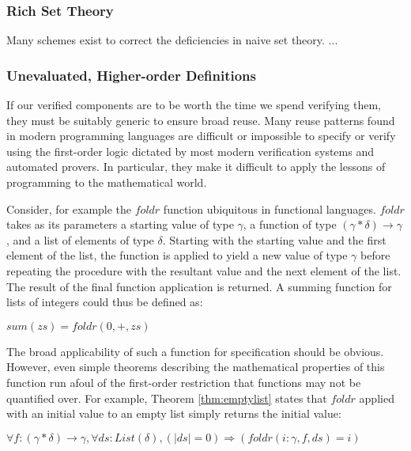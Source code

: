 \subsubsection{Rich Set Theory}\label{subsubsect:richSetTheory}
Many schemes exist to correct the deficiencies in naive set theory.  ...

\subsubsection{Unevaluated, Higher-order Definitions}\label{subsubsect:higherOrderDefinitions}
If our verified components are to be worth the time we spend verifying them, they must be suitably generic to ensure broad reuse.  Many reuse patterns found in modern programming languages are difficult or impossible to specify or verify using the first-order logic dictated by most modern verification systems and automated provers.  In particular, they make it difficult to apply the lessons of programming to the mathematical world.

Consider, for example the $foldr$ function ubiquitous in functional languages.  $foldr$ takes as its parameters a starting value of type $\gamma$, a function of type $(\gamma*\delta)\rightarrow\gamma$, and a list of elements of type $\delta$.  Starting with the starting value and the first element of the list, the function is applied to yield a new value of type $\gamma$ before repeating the procedure with the resultant value and the next element of the list.  The result of the final function application is returned.  A summing function for lists of integers could thus be defined as:

$sum(zs) = foldr(0, +, zs)$

The broad applicability of such a function for specification should be obvious.  However, even simple theorems describing the mathematical properties of this function run afoul of the first-order restriction that functions may not be quantified over.  For example, Theorem \ref{thm:emptylist} states that $foldr$ applied with an initial value to an empty list simply returns the initial value:

\begin{thm}
\label{thm:emptylist}
$\forall f : (\gamma*\delta)\rightarrow\gamma, \forall ds : List(\delta), (|ds| = 0) \Rightarrow (foldr(i : \gamma, f, ds) = i)$
\end{thm}

